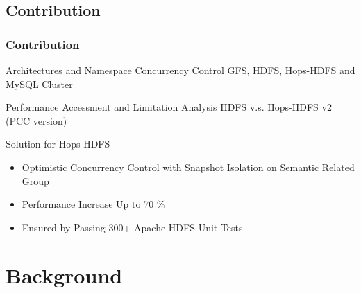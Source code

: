 \documentclass{beamer}
\begin{document}
\subsection{Contribution}
\begin{frame}
\frametitle{Contribution}
\begin{block}{Architectures and Namespace Concurrency Control}
GFS, HDFS, Hops-HDFS and MySQL Cluster
\end{block}

\begin{block}{Performance Accessment and Limitation Analysis}
HDFS v.s. Hops-HDFS v2 (PCC version)
\end{block}

\begin{block}{Solution for Hops-HDFS}
	\begin{itemize}
		\item Optimistic Concurrency Control with Snapshot Isolation on Semantic Related Group
		\item Performance Increase Up to 70 \%
		\item Ensured by Passing 300+ Apache HDFS Unit Tests
	\end{itemize}
\end{block}
\end{frame}

\section{Background}
\end{document}
